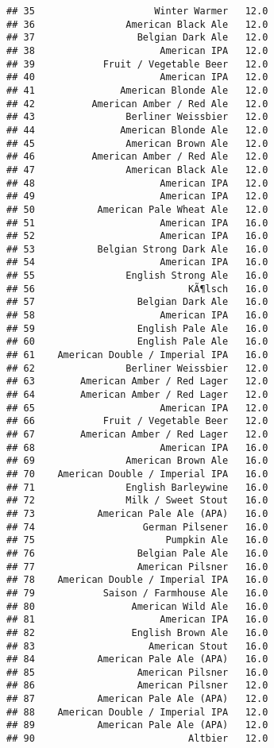 \documentclass[
]{article}
\begin{document}
\begin{verbatim}
## 35                     Winter Warmer   12.0
## 36                American Black Ale   12.0
## 37                  Belgian Dark Ale   12.0
## 38                      American IPA   12.0
## 39            Fruit / Vegetable Beer   12.0
## 40                      American IPA   12.0
## 41               American Blonde Ale   12.0
## 42          American Amber / Red Ale   12.0
## 43                Berliner Weissbier   12.0
## 44               American Blonde Ale   12.0
## 45                American Brown Ale   12.0
## 46          American Amber / Red Ale   12.0
## 47                American Black Ale   12.0
## 48                      American IPA   12.0
## 49                      American IPA   12.0
## 50           American Pale Wheat Ale   12.0
## 51                      American IPA   16.0
## 52                      American IPA   16.0
## 53           Belgian Strong Dark Ale   16.0
## 54                      American IPA   16.0
## 55                English Strong Ale   16.0
## 56                           KÃ¶lsch   16.0
## 57                  Belgian Dark Ale   16.0
## 58                      American IPA   16.0
## 59                  English Pale Ale   16.0
## 60                  English Pale Ale   16.0
## 61    American Double / Imperial IPA   16.0
## 62                Berliner Weissbier   12.0
## 63        American Amber / Red Lager   12.0
## 64        American Amber / Red Lager   12.0
## 65                      American IPA   12.0
## 66            Fruit / Vegetable Beer   12.0
## 67        American Amber / Red Lager   12.0
## 68                      American IPA   16.0
## 69                American Brown Ale   16.0
## 70    American Double / Imperial IPA   16.0
## 71                English Barleywine   16.0
## 72                Milk / Sweet Stout   16.0
## 73           American Pale Ale (APA)   16.0
## 74                   German Pilsener   16.0
## 75                       Pumpkin Ale   16.0
## 76                  Belgian Pale Ale   16.0
## 77                  American Pilsner   16.0
## 78    American Double / Imperial IPA   16.0
## 79            Saison / Farmhouse Ale   16.0
## 80                 American Wild Ale   16.0
## 81                      American IPA   16.0
## 82                 English Brown Ale   16.0
## 83                    American Stout   16.0
## 84           American Pale Ale (APA)   16.0
## 85                  American Pilsner   16.0
## 86                  American Pilsner   12.0
## 87           American Pale Ale (APA)   12.0
## 88    American Double / Imperial IPA   12.0
## 89           American Pale Ale (APA)   12.0
## 90                           Altbier   12.0

\end{verbatim}
\end{document}
